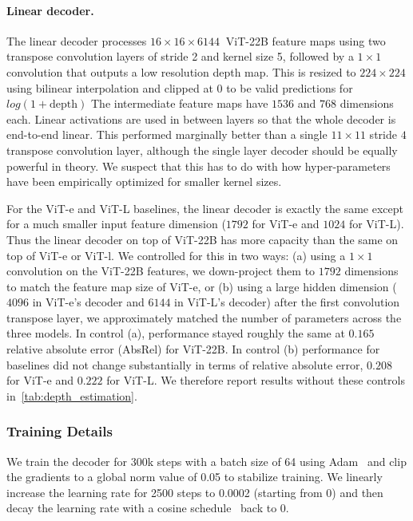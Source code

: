 \paragraph{Linear decoder.}

The linear decoder processes $16\times 16 \times 6144~$ ViT-22B feature maps using two transpose convolution layers of stride 2 and kernel size 5, followed by a $1\times 1$ convolution that outputs a low resolution depth map.
This is resized to $224\times 224$ using bilinear interpolation and clipped at $0$ to be valid predictions for $log\left(1 + \mathrm{depth}\right)$
The intermediate feature maps have $1536$ and $768$ dimensions each.
Linear activations are used in between layers so that the whole decoder is end-to-end linear.
This performed marginally better than a single $11\times 11$ stride $4$ transpose convolution layer, although the single layer decoder should be equally powerful in theory.
We suspect that this has to do with how hyper-parameters have been empirically optimized for smaller kernel sizes.

For the ViT-e and ViT-L baselines, the linear decoder is exactly the same except for a much smaller input feature dimension ($1792$ for ViT-e and $1024$ for ViT-L).
Thus the linear decoder on top of ViT-22B has more capacity than the same on top of ViT-e or ViT-l.
We controlled for this in two ways: (a) using a $1\times 1$ convolution on the ViT-22B features, we down-project them to $1792$ dimensions to match the feature map size of ViT-e, or (b) using a large hidden dimension ($4096$ in ViT-e's decoder and $6144$ in ViT-L's decoder) after the first convolution transpose layer, we approximately matched the number of parameters across the three models. In control (a), performance stayed roughly the same at $0.165$ relative absolute error (AbsRel) for ViT-22B. In control (b) performance for baselines did not change substantially in terms of relative absolute error, $0.208$ for ViT-e and $0.222$ for ViT-L. We therefore report results without these controls in~\cref{tab:depth_estimation}.

\subsubsection{Training Details}

We train the decoder for 300k steps with a batch size of 64 using Adam~\citep{kingma2014adam} and clip the gradients to a global norm value of 0.05 to stabilize training.
We linearly increase the learning rate for 2500 steps to 0.0002 (starting from 0) and then decay the learning rate with a cosine schedule~\citep{loshchilov2016sgdr} back to 0.

